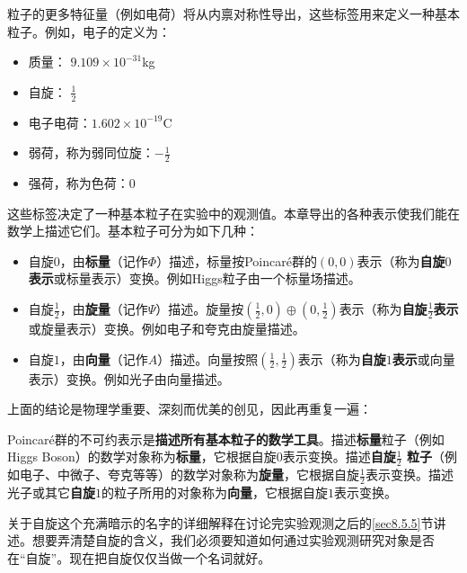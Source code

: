 粒子的更多特征量（例如电荷）将从内禀对称性导出，这些标签用来定义一种基本粒子。例如，电子的定义为：
\begin{itemize}
    \item 质量： $9.109 \times 10^{-31}$kg
    \item 自旋： $\frac{1}{2}$
    \item 电子电荷：$1.602 \times 10^{-19}$C
    \item 弱荷，称为弱同位旋：$-\frac{1}{2}$
    \item 强荷，称为色荷：$0$
\end{itemize}
这些标签决定了一种基本粒子在实验中的观测值。本章导出的各种表示使我们能在数学上描述它们。基本粒子可分为如下几种：
\begin{itemize}
    \item 自旋$0$，由{\bf 标量}（记作$\Phi$）描述，标量按Poincar\'e群的$(0, 0)$表示（称为{\bf 自旋$0$表示}或标量表示）变换。例如Higgs粒子由一个标量场描述。
    \item 自旋$\frac{1}{2}$，由{\bf 旋量}（记作$\Psi$）描述。旋量按$(\frac{1}{2}, 0) \oplus (0, \frac{1}{2})$表示（称为{\bf 自旋$\frac{1}{2}$表示}或旋量表示）变换。例如电子和夸克由旋量描述。
    \item 自旋$1$，由{\bf 向量}（记作$A$）描述。向量按照$(\frac{1}{2}, \frac{1}{2})$表示（称为{\bf 自旋$1$表示}或向量表示）变换。例如光子由向量描述。
\end{itemize}

上面的结论是物理学重要、深刻而优美的创见，因此再重复一遍：

Poincar\'e群的不可约表示是{\bf 描述所有基本粒子的数学工具}。描述{\bf 标量}粒子（例如Higgs Boson）的数学对象称为{\bf 标量}，它根据自旋$0$表示变换。描述{\bf 自旋$\frac{1}{2}$ 粒子}（例如电子、中微子、夸克等等）的数学对象称为{\bf 旋量}，它根据自旋$\frac{1}{2}$表示变换。描述光子或其它{\bf 自旋$1$}的粒子所用的对象称为{\bf 向量}，它根据自旋$1$表示变换。

关于自旋这个充满暗示的名字的详细解释在讨论完实验观测之后的\ref{sec8.5.5}节讲述。想要弄清楚自旋的含义，我们必须要知道如何通过实验观测研究对象是否在``自旋''。现在把自旋仅仅当做一个名词就好。

